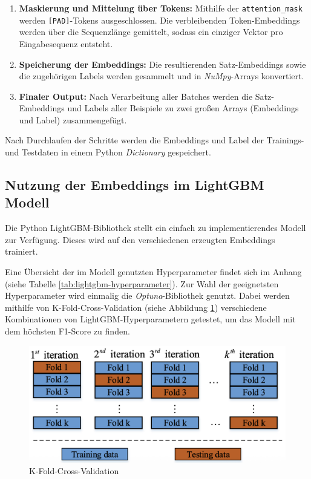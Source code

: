\begin{enumerate}
  \item \textbf{Maskierung und Mittelung über Tokens:}  
  Mithilfe der \texttt{attention\_mask} werden \texttt{[PAD]}-Tokens ausgeschlossen. 
  Die verbleibenden Token-Embeddings werden über die Sequenzlänge gemittelt, sodass ein einziger Vektor pro Eingabesequenz entsteht.

  \item \textbf{Speicherung der Embeddings:}  
  Die resultierenden Satz-Embeddings sowie die zugehörigen Labels werden gesammelt und in \textit{NuMpy}-Arrays konvertiert.

  \item \textbf{Finaler Output:}  
  Nach Verarbeitung aller Batches werden die Satz-Embeddings und Labels aller Beispiele zu zwei großen Arrays (Embeddings und Label) zusammengefügt.
\end{enumerate}

Nach Durchlaufen der Schritte werden die Embeddings und Label der Trainings- und Testdaten in einem Python \textit{Dictionary} gespeichert.

\subsection{Nutzung der Embeddings im LightGBM Modell}

Die Python LightGBM-Bibliothek stellt ein einfach zu implementierendes Modell zur Verfügung.
Dieses wird auf den verschiedenen erzeugten Embeddings trainiert.

Eine Übersicht der im Modell genutzten Hyperparameter findet sich im Anhang (siehe Tabelle \ref{tab:lightgbm-hyperparameter}).
Zur Wahl der geeignetsten Hyperparameter wird einmalig die \textit{Optuna}-Bibliothek genutzt.
Dabei werden mithilfe von K-Fold-Cross-Validation (siehe Abbildung \ref{fig:k-fold_cross-validation}) verschiedene Kombinationen von LightGBM-Hyperparametern getestet, 
um das Modell mit dem höchsten F1-Score zu finden.

\begin{figure}[htbp]
    \begin{center}
        \includegraphics[scale=0.4]{static/k-fold_cross-validation.png}
        \caption{\label{fig:k-fold_cross-validation} K-Fold-Cross-Validation \cite{isaac2021}}
    \end{center}
\end{figure}

